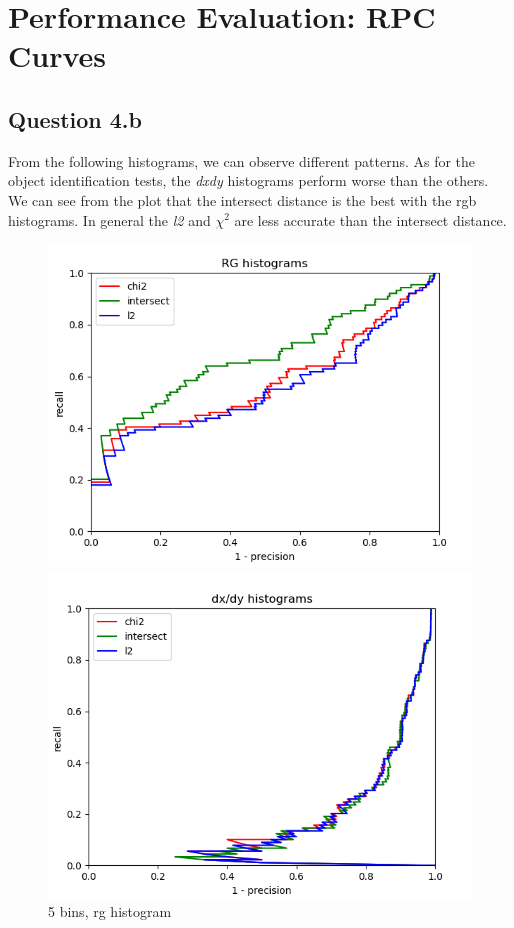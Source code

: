 \documentclass{article}
\begin{document}
\newpage
\section{Performance Evaluation: RPC Curves}
\subsection{Question 4.b}
From the following histograms, we can observe different patterns. As for the object identification tests, the \textit{dxdy} histograms perform worse than the others.
We can see from the plot that the intersect distance is the best with the rgb histograms. In general the \textit{l2} and $\chi^2$ are less accurate than the intersect distance.

\begin{figure}[ht]
    \centering
    \begin{minipage}{.5\textwidth}
        \includegraphics[width=\linewidth]{images/Q4.b-rg_histogram_5_bins.png}
        \caption{5 bins, rg histogram}
    \end{minipage}\hfill
    \begin{minipage}{.5\textwidth}
        \includegraphics[width=\linewidth]{images/Q4.b-dxdy_histogram_5_bins.png}

\end{minipage}
\end{figure}
\end{document}
